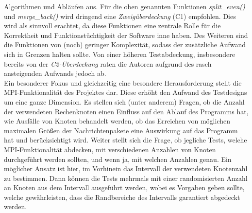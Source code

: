 Algorithmen und Abläufen aus. Für die oben genannten Funktionen \textit{split\_even()} und \textit{merge\_back()} wird dringend eine \textit{Zweigüberdeckung} (C1) empfohlen. Dies wird als sinnvoll erachtet, da diese Funktionen eine zentrale Rolle für die Korrektheit und Funktionstüchtigkeit der Software inne haben. Des Weiteren sind die Funktionen von (noch) geringer Komplexität, sodass der zusätzliche Aufwand sich in Grenzen halten sollte. Von einer höheren Testabdeckung, insbesondere bereits von der \textit{C2-Überdeckung} raten die Autoren aufgrund des rasch ansteigenden Aufwands jedoch ab.
\\
Ein besonderer Fokus und gleichzeitig eine besondere Herausforderung stellt die MPI-Funktionalität des Projektes dar. Diese erhöht den Aufwand des Testdesigns um eine ganze Dimension. Es stellen sich (unter anderem) Fragen, ob die Anzahl der verwendeten Rechenknoten einen Einfluss auf den Ablauf des Programms hat, wie Ausfälle von Knoten behandelt werden, ob das Erreichen von möglichen maximalen Größen der Nachrichtenpakete eine Auswirkung auf das Programm hat und berücksichtigt wird. Weiter stellt sich die Frage, ob jegliche Tests, welche MPI-Funktionalität abdecken, mit verschiedenen Anzahlen von Knoten durchgeführt werden sollten, und wenn ja, mit welchen Anzahlen genau. Ein möglicher Ansatz ist hier, im Vorhinein das Intervall der verwendeten Knotenzahl zu bestimmen. Dann können die Tests mehrmals mit einer randomisierten Anzahl an Knoten aus dem Intervall ausgeführt werden, wobei es Vorgaben geben sollte, welche gewährleisten, dass die Randbereiche des Intervalls garantiert abgedeckt werden.